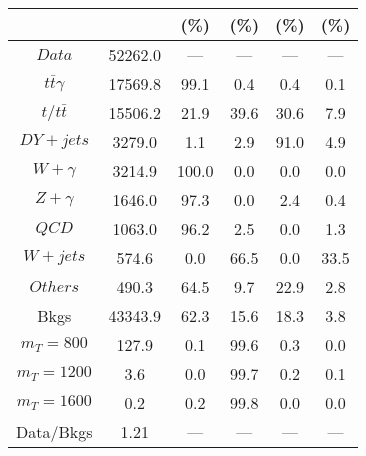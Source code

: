 \begin{figure}
\begin{minipage}[c]{0.32\textwidth}
{\begin{tabular}{cccccc}
 &  & (\%) & (\%) & (\%) & (\%)  \\
\hline
                                                                      $ Data $ &  52262.0 &  --- &  --- &  --- &  ---\\
$ t\bar{t}\gamma $ &  17569.8 &  99.1 &  0.4 &  0.4 &  0.1\\
$ t/t\bar{t} $ &  15506.2 &  21.9 &  39.6 &  30.6 &  7.9\\
$ DY+jets $ &  3279.0 &  1.1 &  2.9 &  91.0 &  4.9\\
$ W+\gamma $ &  3214.9 &  100.0 &  0.0 &  0.0 &  0.0\\
$ Z+\gamma $ &  1646.0 &  97.3 &  0.0 &  2.4 &  0.4\\
$ QCD $ &  1063.0 &  96.2 &  2.5 &  0.0 &  1.3\\
$ W+jets $ &  574.6 &  0.0 &  66.5 &  0.0 &  33.5\\
$ Others $ &  490.3 &  64.5 &  9.7 &  22.9 &  2.8\\
Bkgs &  43343.9 &  62.3 &  15.6 &  18.3 &  3.8\\
$ m_{T} = 800 $ &  127.9 &  0.1 &  99.6 &  0.3 &  0.0\\
$ m_{T} = 1200 $ &  3.6 &  0.0 &  99.7 &  0.2 &  0.1\\
$ m_{T} = 1600 $ &  0.2 &  0.2 &  99.8 &  0.0 &  0.0\\
Data/Bkgs &  1.21 &  --- &  --- &  --- &  ---\\
\hline
\end{tabular}
}
\end{minipage}
\end{figure}

